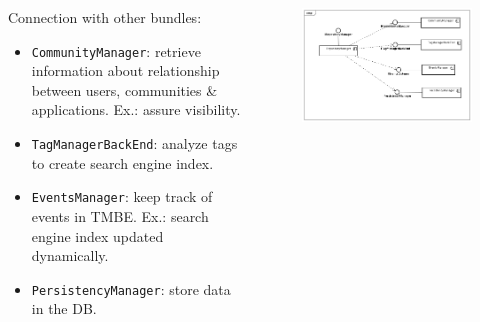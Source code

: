 \begin{frame}


\begin{columns}

	\begin{column}{6cm}
	Connection with other bundles:
	
	\begin{itemize}
	  \item \texttt{CommunityManager}: retrieve information about relationship
	  between users, communities \& applications. Ex.: assure visibility.
	  \item \texttt{TagManagerBackEnd}: analyze tags to create search engine index.
	  \item \texttt{EventsManager}: keep track of events in TMBE. Ex.: search
	  engine index updated dynamically.
	  \item \texttt{PersistencyManager}: store data in the DB.
	\end{itemize}
		
	
	\end{column}
	
		\begin{column}{7cm}
	    
			\begin{figure}
			 	\includegraphics[scale=0.21]{img/RepositoryManagerComponentsDiagram.png}
			\end{figure}
	    
	    \end{column}
	
\end{columns}

\end{frame}


